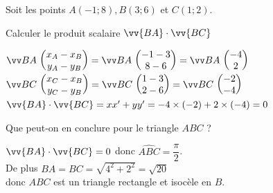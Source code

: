 \documentclass[12pt,a4paper]{article}  %
\begin{document}
\vspace{-0.3cm}
Soit les points $A(-1 ; 8), B(3 ; 6)$ et $C(1 ; 2)$.
\begin{enumMet}
	\item {} Calculer le produit scalaire $\vv{B A} \cdot \vv{B C}$\quad {}\\
	\begin{corrBox}
		$\Coord{BA}{x_A-x_B}{y_A-y_B}=\Coord{BA}{-1-3}{8-6}=\Coord{BA}{-4}{2}$\\
		$\Coord{BC}{x_C-x_B}{y_C-y_B}=\Coord{BC}{1-3}{2-6}=\Coord{BC}{-2}{-4}$\\
		$\vv{B A} \cdot \vv{B C}=x x^{\prime}+y y^{\prime}=-4 \times(-2)+2 \times(-4)=0$
	\end{corrBox}
	\item {} Que peut-on en conclure pour le triangle $A B C$ ?\quad {}\\
	\begin{corrBox}
		$\vv{B A} \cdot \vv{B C}=0$ donc $\widehat{A B C}=\dfrac{\pi}{2}$.\\
		De plus $B A=B C=\sqrt{4^{2}+2^{2}}=\sqrt{20}$\\
		donc $A B C$ est un triangle rectangle et isocèle en $B$.
	\end{corrBox}
\end{enumMet}


\end{document}

